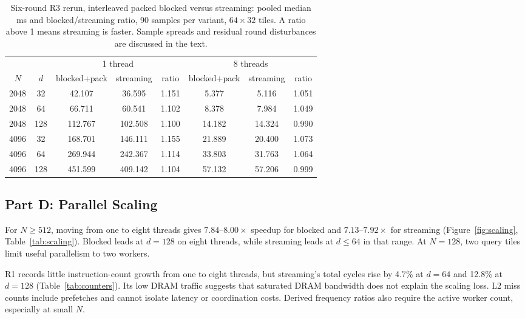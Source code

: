 \documentclass[11pt,a4paper]{article}
\begin{document}
\begin{table}[!htbp]
\centering
\fontsize{9}{11}\selectfont
\setlength{\tabcolsep}{5pt}
\renewcommand{\arraystretch}{1.16}
\caption{Six-round R3 rerun, interleaved packed blocked versus streaming:
pooled median ms and blocked/streaming ratio, 90 samples per variant,
$64\times32$ tiles. A ratio above 1 means streaming is faster.
Sample spreads and residual round disturbances are discussed in the text.}
\label{tab:matched}
\begin{tabular}{@{}cc ccc ccc@{}}
\toprule
 & & \multicolumn{3}{c}{1 thread} & \multicolumn{3}{c}{8 threads} \\
\cmidrule(lr){3-5}\cmidrule(l){6-8}
$N$ & $d$ & blocked+pack & streaming & ratio & blocked+pack & streaming & ratio \\
\midrule
2048 & 32  & 42.107  & 36.595  & 1.151 & 5.377  & 5.116  & 1.051 \\
2048 & 64  & 66.711  & 60.541  & 1.102 & 8.378  & 7.984  & 1.049 \\
2048 & 128 & 112.767 & 102.508 & 1.100 & 14.182 & 14.324 & 0.990 \\
4096 & 32  & 168.701 & 146.111 & 1.155 & 21.889 & 20.400 & 1.073 \\
4096 & 64  & 269.944 & 242.367 & 1.114 & 33.803 & 31.763 & 1.064 \\
4096 & 128 & 451.599 & 409.142 & 1.104 & 57.132 & 57.206 & 0.999 \\
\bottomrule
\end{tabular}
\end{table}



\subsection{Part D: Parallel Scaling}
\label{sec:eval-d}
For $N\ge512$, moving from one to eight threads gives $7.84$--$8.00\times$
speedup for blocked and $7.13$--$7.92\times$ for streaming
(Figure~\ref{fig:scaling}, Table~\ref{tab:scaling}).
Blocked leads at $d=128$ on eight threads, while streaming leads at $d\le64$
in that range. At $N=128$, two query tiles limit useful parallelism to two workers.

R1 records little instruction-count growth from one to eight threads, but
streaming's total cycles rise by 4.7\% at $d=64$ and 12.8\% at $d=128$
(Table~\ref{tab:counters}). Its low DRAM traffic suggests that saturated DRAM
bandwidth does not explain the scaling loss. L2 miss counts include prefetches
and cannot isolate latency or coordination costs. Derived frequency ratios
also require the active worker count, especially at small $N$.
\end{document}
